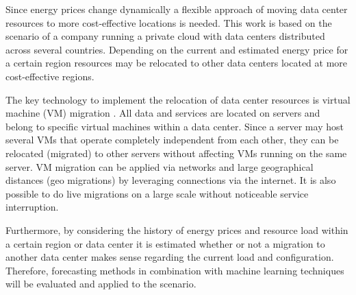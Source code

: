 \documentclass[a4paper]{article}
\begin{document}

Since energy prices change dynamically a flexible approach of moving data center resources to more cost-effective locations is needed. This work is based on the scenario of a company running a private cloud with data centers distributed across several countries. Depending on the current and estimated energy price for a certain region resources may be relocated to other data centers located at more cost-effective regions.

The key technology to implement the relocation of data center resources is virtual machine (VM) migration \cite{nelson2009virtual}. All data and services are located on servers and belong to specific virtual machines within a data center. Since a server may host several VMs that operate completely independent from each other, they can be relocated (migrated) to other servers without affecting VMs running on the same server. VM migration can be applied via networks and large geographical distances (geo migrations) by leveraging connections via the internet. It is also possible to do live migrations on a large scale without noticeable service interruption. 

Furthermore, by considering the history of energy prices and resource load within a certain region or data center it is estimated whether or not a migration to another data center makes sense regarding the current load and configuration. Therefore, forecasting methods in combination with machine learning techniques will be evaluated and applied to the scenario. 
\end{document}
